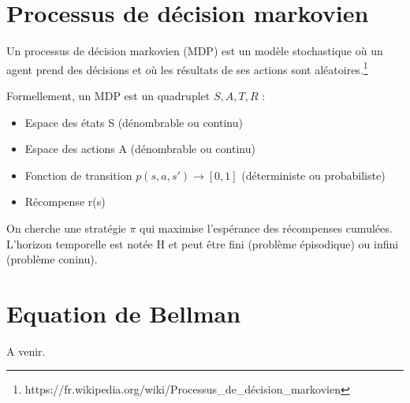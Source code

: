 \documentclass{article}
\begin{document}
\section{Processus de décision markovien}

Un processus de décision markovien (MDP) est un modèle stochastique où un agent prend des décisions et où les résultats de ses actions sont aléatoires.\footnote{https://fr.wikipedia.org/wiki/Processus\_de\_décision\_markovien}

Formellement, un MDP est un quadruplet ${S, A, T, R}$ :
\begin{itemize}
\item Espace des états S (dénombrable ou continu)
\item Espace des actions A (dénombrable ou continu)
\item Fonction de transition $p(s, a, s') \rightarrow [0, 1]$ (déterministe ou probabiliste)
\item Récompense r(s)
\end{itemize}

On cherche une stratégie $\pi$ qui maximise l'espérance des récompenses cumulées.\\
L'horizon temporelle est notée H et peut être fini (problème épisodique) ou infini (problème coninu).

\section{Equation de Bellman}

A venir.
\end{document}

